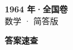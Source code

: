\documentclass[zihao=-4, a4paper]{ctexart}
\begin{document}
\begin{center}
  {\Large\bfseries 1964 年·全国卷}\\[4pt]
  {\large 数学 · 简答版}
\end{center}
\medskip
{}

\clearpage
{}
\begin{center}{\Large\bfseries 答案速查}\end{center}
\medskip

\end{document}
